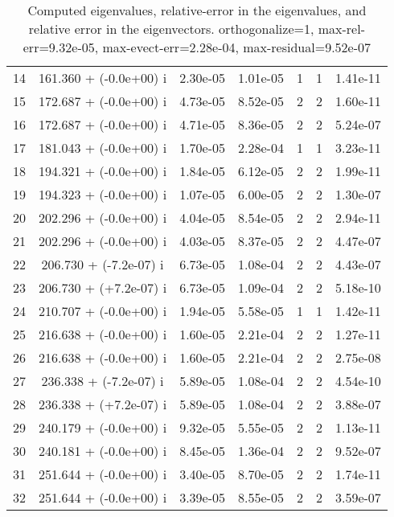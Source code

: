 \begin{table}[H]
\begin{center}
\begin{tabular}{|c|c|c|c|c|c|c|}
    14  &    161.360 + (-0.0e+00) i  &    2.30e-05      &   1.01e-05    &   1    &  1   &    1.41e-11 \\
    15  &    172.687 + (-0.0e+00) i  &    4.73e-05      &   8.52e-05    &   2    &  2   &    1.60e-11 \\
    16  &    172.687 + (-0.0e+00) i  &    4.71e-05      &   8.36e-05    &   2    &  2   &    5.24e-07 \\
    17  &    181.043 + (-0.0e+00) i  &    1.70e-05      &   2.28e-04    &   1    &  1   &    3.23e-11 \\
    18  &    194.321 + (-0.0e+00) i  &    1.84e-05      &   6.12e-05    &   2    &  2   &    1.99e-11 \\
    19  &    194.323 + (-0.0e+00) i  &    1.07e-05      &   6.00e-05    &   2    &  2   &    1.30e-07 \\
    20  &    202.296 + (-0.0e+00) i  &    4.04e-05      &   8.54e-05    &   2    &  2   &    2.94e-11 \\
    21  &    202.296 + (-0.0e+00) i  &    4.03e-05      &   8.37e-05    &   2    &  2   &    4.47e-07 \\
    22  &    206.730 + (-7.2e-07) i  &    6.73e-05      &   1.08e-04    &   2    &  2   &    4.43e-07 \\
    23  &    206.730 + (+7.2e-07) i  &    6.73e-05      &   1.09e-04    &   2    &  2   &    5.18e-10 \\
    24  &    210.707 + (-0.0e+00) i  &    1.94e-05      &   5.58e-05    &   1    &  1   &    1.42e-11 \\
    25  &    216.638 + (-0.0e+00) i  &    1.60e-05      &   2.21e-04    &   2    &  2   &    1.27e-11 \\
    26  &    216.638 + (-0.0e+00) i  &    1.60e-05      &   2.21e-04    &   2    &  2   &    2.75e-08 \\
    27  &    236.338 + (-7.2e-07) i  &    5.89e-05      &   1.08e-04    &   2    &  2   &    4.54e-10 \\
    28  &    236.338 + (+7.2e-07) i  &    5.89e-05      &   1.08e-04    &   2    &  2   &    3.88e-07 \\
    29  &    240.179 + (-0.0e+00) i  &    9.32e-05      &   5.55e-05    &   2    &  2   &    1.13e-11 \\
    30  &    240.181 + (-0.0e+00) i  &    8.45e-05      &   1.36e-04    &   2    &  2   &    9.52e-07 \\
    31  &    251.644 + (-0.0e+00) i  &    3.40e-05      &   8.70e-05    &   2    &  2   &    1.74e-11 \\
    32  &    251.644 + (-0.0e+00) i  &    3.39e-05      &   8.55e-05    &   2    &  2   &    3.59e-07 \\
\hline
\end{tabular}
\caption{Computed eigenvalues, relative-error in the eigenvalues, and relative error in the eigenvectors. orthogonalize=1, max-rel-err=9.32e-05, max-evect-err=2.28e-04, max-residual=9.52e-07
}\label{table:genEigspipeze4.order4.ng3.hdf}
\end{center}
\end{table}
